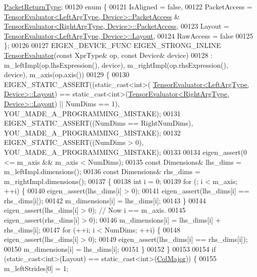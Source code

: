 \begin{DoxyCode}
      \hyperlink{group___sparse_core___module}{PacketReturnType};
00120   \textcolor{keyword}{enum} \{
00121     IsAligned = \textcolor{keyword}{false},
00122     PacketAccess = \hyperlink{struct_eigen_1_1_tensor_evaluator}{TensorEvaluator<LeftArgType, Device>::PacketAccess}
       & \hyperlink{struct_eigen_1_1_tensor_evaluator}{TensorEvaluator<RightArgType, Device>::PacketAccess},
00123     Layout = \hyperlink{struct_eigen_1_1_tensor_evaluator}{TensorEvaluator<LeftArgType, Device>::Layout},
00124     RawAccess = \textcolor{keyword}{false}
00125   \};
00126 
00127   EIGEN\_DEVICE\_FUNC EIGEN\_STRONG\_INLINE \hyperlink{struct_eigen_1_1_tensor_evaluator}{TensorEvaluator}(\textcolor{keyword}{const} XprType& op, \textcolor{keyword}{const} Device& 
      device)
00128     : m\_leftImpl(op.lhsExpression(), device), m\_rightImpl(op.rhsExpression(), device), m\_axis(op.axis())
00129   \{
00130     EIGEN\_STATIC\_ASSERT((static\_cast<int>(
      \hyperlink{struct_eigen_1_1_tensor_evaluator}{TensorEvaluator<LeftArgType, Device>::Layout}) == 
      static\_cast<int>(\hyperlink{struct_eigen_1_1_tensor_evaluator}{TensorEvaluator<RightArgType, Device>::Layout}) || NumDims ==
       1), YOU\_MADE\_A\_PROGRAMMING\_MISTAKE);
00131     EIGEN\_STATIC\_ASSERT((NumDims == RightNumDims), YOU\_MADE\_A\_PROGRAMMING\_MISTAKE);
00132     EIGEN\_STATIC\_ASSERT((NumDims > 0), YOU\_MADE\_A\_PROGRAMMING\_MISTAKE);
00133 
00134     eigen\_assert(0 <= m\_axis && m\_axis < NumDims);
00135     \textcolor{keyword}{const} Dimensions& lhs\_dims = m\_leftImpl.dimensions();
00136     \textcolor{keyword}{const} Dimensions& rhs\_dims = m\_rightImpl.dimensions();
00137     \{
00138       \textcolor{keywordtype}{int} i = 0;
00139       \textcolor{keywordflow}{for} (; i < m\_axis; ++i) \{
00140         eigen\_assert(lhs\_dims[i] > 0);
00141         eigen\_assert(lhs\_dims[i] == rhs\_dims[i]);
00142         m\_dimensions[i] = lhs\_dims[i];
00143       \}
00144       eigen\_assert(lhs\_dims[i] > 0);  \textcolor{comment}{// Now i == m\_axis.}
00145       eigen\_assert(rhs\_dims[i] > 0);
00146       m\_dimensions[i] = lhs\_dims[i] + rhs\_dims[i];
00147       \textcolor{keywordflow}{for} (++i; i < NumDims; ++i) \{
00148         eigen\_assert(lhs\_dims[i] > 0);
00149         eigen\_assert(lhs\_dims[i] == rhs\_dims[i]);
00150         m\_dimensions[i] = lhs\_dims[i];
00151       \}
00152     \}
00153 
00154     \textcolor{keywordflow}{if} (static\_cast<int>(Layout) == static\_cast<int>(\hyperlink{group__enums_ggaacded1a18ae58b0f554751f6cdf9eb13a0cbd4bdd0abcfc0224c5fcb5e4f6669a}{ColMajor})) \{
00155       m\_leftStrides[0] = 1;

\end{DoxyCode}
